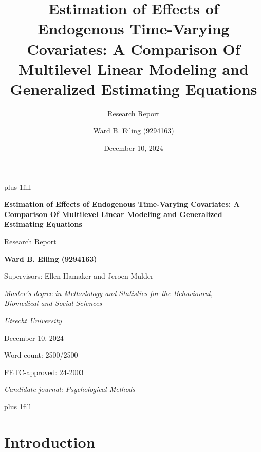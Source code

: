 \documentclass[
  12pt,
  a4paper,
]{article}
\title{Estimation of Effects of Endogenous Time-Varying Covariates: A
Comparison Of Multilevel Linear Modeling and Generalized Estimating
Equations}
\subtitle{Research Report}
\author{Ward B. Eiling (9294163)}
\date{December 10, 2024}
\begin{document}
\cleardoublepage
\thispagestyle{empty}
{\centering
\hbox{}\vskip 0cm plus 1fill
{\Large\bfseries Estimation of Effects of Endogenous Time-Varying
Covariates: A Comparison Of Multilevel Linear Modeling and Generalized
Estimating Equations \par}
\vspace{3ex}
{\large Research Report \par}
\vspace{9ex}
{\large\bfseries Ward B. Eiling (9294163) \par}
\vspace{3ex}
{\large Supervisors: Ellen Hamaker and Jeroen Mulder \par}
\vspace{9ex}
{\normalsize \textit{Master's degree in Methodology and Statistics for the Behavioural, \\ Biomedical and Social Sciences} \par}
\vspace{3ex}
{\normalsize \textit{Utrecht University} \par}
\vspace{9ex}
{\normalsize December 10, 2024 \par}
\vspace{3ex}
{\normalsize Word count: 2500/2500 \par}
\vspace{9ex}
{\normalsize FETC-approved: 24-2003 \par}
\vspace{9ex}
{\normalsize \textit{Candidate journal: Psychological Methods} \par}
\hbox{}\vskip 0cm plus 1fill
}


\newpage

\section{Introduction}\label{introduction}
\end{document}
